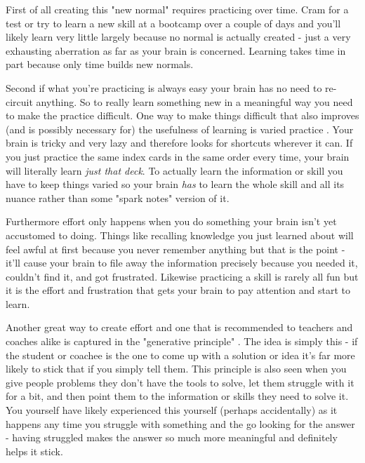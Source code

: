 \documentclass[11pt,a5paper]{book}
\begin{document}
First of all creating this "new normal" requires practicing over time. Cram for a test or try to learn a new skill at a bootcamp over a couple of days and you'll likely learn very little \cite{stick} largely because no normal is actually created - just a very exhausting aberration as far as your brain is concerned. Learning takes time in part because only time builds new normals.
\newline

Second if what you're practicing is always easy your brain has no need to re-circuit anything. So to really learn something new in a meaningful way you need to make the practice difficult. One way to make things difficult that also improves (and is possibly necessary for) the usefulness of learning is varied practice \cite{stick} \cite{ericsson}. Your brain is tricky and very lazy and therefore looks for shortcuts wherever it can. If you just practice the same index cards in the same order every time, your brain will literally learn \textit{just that deck}. To actually learn the information or skill you have to keep things varied so your brain \textit{has} to learn the whole skill and all its nuance rather than some "spark notes" version of it.
\newline

Furthermore effort only happens when you do something your brain isn't yet accustomed to doing. Things like recalling knowledge you just learned about will feel awful at first because you never remember anything but that is the point - it'll cause your brain to file away the information precisely because you needed it, couldn't find it, and got frustrated. Likewise practicing a skill is rarely all fun but it is the effort and frustration that gets your brain to pay attention and start to learn. 
\newline

Another great way to create effort and one that is recommended to teachers and coaches alike is captured in the "generative principle" \cite{stick} \cite{stanier} \cite{coactive}. The idea is simply this - if the student or coachee is the one to come up with a solution or idea it's far more likely to stick that if you simply tell them. This principle is also seen when you give people problems they don't have the tools to solve, let them struggle with it for a bit, and then point them to the information or skills they need to solve it. You yourself have likely experienced this yourself (perhaps accidentally) as it happens any time you struggle with something and the go looking for the answer - having struggled makes the answer so much more meaningful and definitely helps it stick.
\newline
\end{document}
